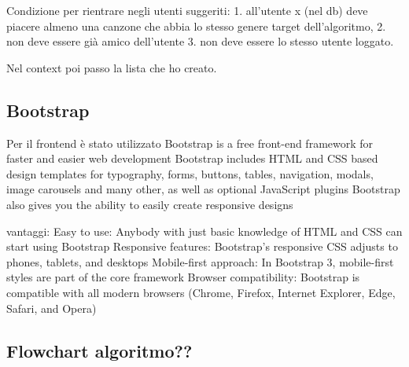 Condizione per rientrare negli utenti suggeriti:
1. all'utente x (nel db) deve piacere almeno una canzone che abbia lo stesso genere target dell'algoritmo, 
2. non deve essere già amico dell'utente
3. non deve essere lo stesso utente loggato. 

Nel context poi passo la lista che ho creato. 

\subsection{Bootstrap}
Per il frontend è stato utilizzato Bootstrap is a free front-end framework for faster and easier web development
Bootstrap includes HTML and CSS based design templates for typography, forms, buttons, tables, navigation, modals, image carousels and many other, as well as optional JavaScript plugins
Bootstrap also gives you the ability to easily create responsive designs

vantaggi: 
Easy to use: Anybody with just basic knowledge of HTML and CSS can start using Bootstrap
Responsive features: Bootstrap's responsive CSS adjusts to phones, tablets, and desktops
Mobile-first approach: In Bootstrap 3, mobile-first styles are part of the core framework
Browser compatibility: Bootstrap is compatible with all modern browsers (Chrome, Firefox, Internet Explorer, Edge, Safari, and Opera)


\subsection{Flowchart algoritmo??}
